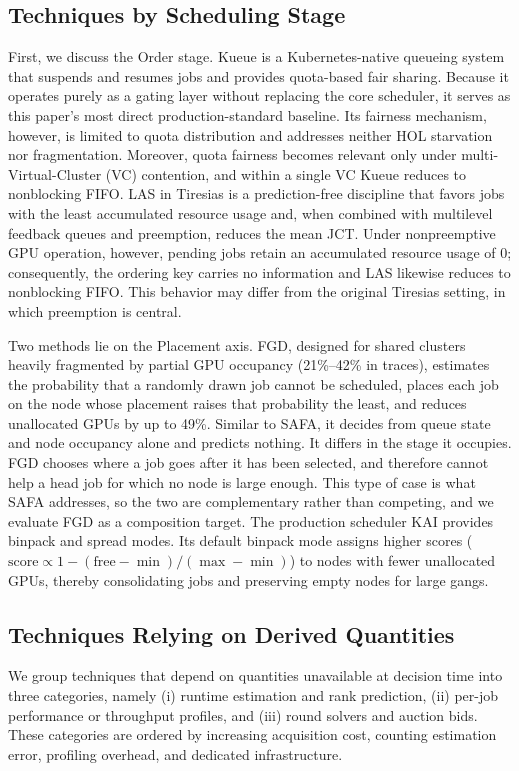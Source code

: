 \documentclass{ieeetj}
\begin{document}
\subsection{Techniques by Scheduling Stage}
First, we discuss the Order stage. Kueue\cite{kueue2024} is a Kubernetes-native queueing system that suspends and resumes jobs and provides quota-based fair sharing. Because it operates purely as a gating layer without replacing the core scheduler, it serves as this paper's most direct production-standard baseline. Its fairness mechanism, however, is limited to quota distribution and addresses neither HOL starvation nor fragmentation. Moreover, quota fairness becomes relevant only under multi-Virtual-Cluster (VC) contention, and within a single VC Kueue reduces to nonblocking FIFO. LAS in Tiresias\cite{gu2019tiresias} is a prediction-free discipline that favors jobs with the least accumulated resource usage and, when combined with multilevel feedback queues and preemption, reduces the mean JCT. Under nonpreemptive GPU operation, however, pending jobs retain an accumulated resource usage of 0; consequently, the ordering key carries no information and LAS likewise reduces to nonblocking FIFO. This behavior may differ from the original Tiresias setting, in which preemption is central.

Two methods lie on the Placement axis. FGD\cite{weng2023beware}, designed for shared clusters heavily fragmented by partial GPU occupancy (21\%--42\% in traces), estimates the probability that a randomly drawn job cannot be scheduled, places each job on the node whose placement raises that probability the least, and reduces unallocated GPUs by up to 49\%. Similar to SAFA, it decides from queue state and node occupancy alone and predicts nothing. It differs in the stage it occupies. FGD chooses where a job goes after it has been selected, and therefore cannot help a head job for which no node is large enough. This type of case is what SAFA addresses, so the two are complementary rather than competing, and we evaluate FGD as a composition target. The production scheduler KAI\cite{kai2025} provides binpack and spread modes. Its default binpack mode assigns higher scores ($\text{score}\propto 1-(\text{free}-\min)/(\max-\min)$) to nodes with fewer unallocated GPUs, thereby consolidating jobs and preserving empty nodes for large gangs.

\subsection{Techniques Relying on Derived Quantities}
We group techniques that depend on quantities unavailable at decision time into three categories, namely (i) runtime estimation and rank prediction, (ii) per-job performance or throughput profiles, and (iii) round solvers and auction bids. These categories are ordered by increasing acquisition cost, counting estimation error, profiling overhead, and dedicated infrastructure.
\end{document}
